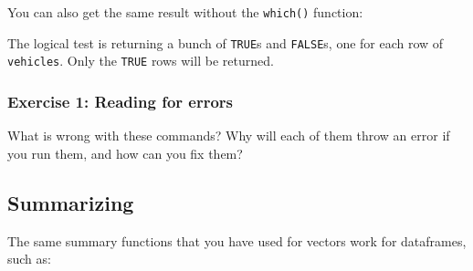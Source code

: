 \documentclass[
]{book}
\newenvironment{Shaded}{\begin{snugshade}}{\end{snugshade}}
\newcommand{\CommentTok}[1]{\textcolor[rgb]{0.56,0.35,0.01}{\textit{#1}}}
\newcommand{\DecValTok}[1]{\textcolor[rgb]{0.00,0.00,0.81}{#1}}
\newcommand{\FloatTok}[1]{\textcolor[rgb]{0.00,0.00,0.81}{#1}}
\newcommand{\KeywordTok}[1]{\textcolor[rgb]{0.13,0.29,0.53}{\textbf{#1}}}
\newcommand{\NormalTok}[1]{#1}
\newcommand{\OperatorTok}[1]{\textcolor[rgb]{0.81,0.36,0.00}{\textbf{#1}}}
\newcommand{\StringTok}[1]{\textcolor[rgb]{0.31,0.60,0.02}{#1}}
\begin{document}
You can also get the same result without the \texttt{which()} function:

\begin{Shaded}
\end{Shaded}

The logical test is returning a bunch of \texttt{TRUE}s and \texttt{FALSE}s, one for each row of \texttt{vehicles}. Only the \texttt{TRUE} rows will be returned.

\hypertarget{exercise-1-reading-for-errors}{%
\subsubsection*{Exercise 1: Reading for errors}\label{exercise-1-reading-for-errors}}

What is wrong with these commands? Why will each of them throw an error if you run them, and how can you fix them?

\begin{Shaded}
\end{Shaded}

\hypertarget{summarizing}{%
\subsection*{Summarizing}\label{summarizing}}

The same summary functions that you have used for vectors work for dataframes, such as:

\begin{Shaded}
\end{Shaded}
\end{document}
